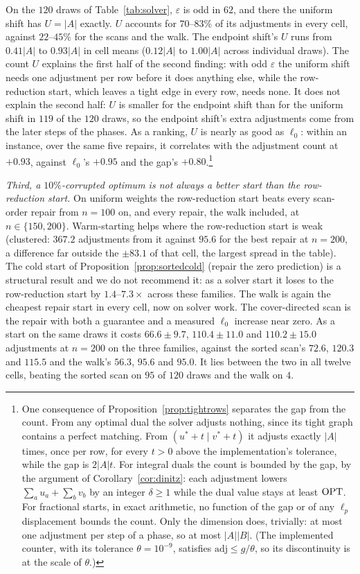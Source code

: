On the $120$ draws of Table~\ref{tab:solver}, $\varepsilon$ is odd in $62$, and there the
uniform shift has $U = |A|$ exactly. $U$ accounts for $70$--$83\%$ of its adjustments in every
cell, against $22$--$45\%$ for the scans and the walk. The endpoint shift's $U$ runs from
$0.41|A|$ to $0.93|A|$ in cell means ($0.12|A|$ to $1.00|A|$ across individual draws). The
count $U$ explains the first half of the second finding: with odd $\varepsilon$ the uniform shift
needs one adjustment per row before it does anything else, while the row-reduction start, which
leaves a tight edge in every row, needs none. It does not explain the second half: $U$ is smaller for
the endpoint shift than for the uniform shift in $119$ of the $120$ draws, so the endpoint shift's
extra adjustments come from the later steps of the phases. As a ranking, $U$ is nearly as good as
$\ell_0$: within an instance, over the same five repairs, it correlates with the adjustment count
at $+0.93$, against $\ell_0$'s $+0.95$ and the gap's $+0.80$.\footnote{One consequence of Proposition~\ref{prop:tightrows} separates the gap from the count. From any optimal dual the solver adjusts nothing, since its tight graph contains a perfect matching. From $(u^* + t \mid v^* + t)$ it adjusts exactly $|A|$ times, once per row, for every $t > 0$ above the implementation's tolerance, while the gap is $2|A|t$. For integral duals the count is bounded by the gap, by the argument of Corollary~\ref{cor:dinitz}: each adjustment lowers $\sum_a u_a + \sum_b v_b$ by an integer $\delta \ge 1$ while the dual value stays at least $\mathrm{OPT}$. For fractional starts, in exact arithmetic, no function of the gap or of any $\ell_p$ displacement bounds the count. Only the dimension does, trivially: at most one adjustment per step of a phase, so at most $|A||B|$. (The implemented counter, with its tolerance $\theta = 10^{-9}$, satisfies $\mathrm{adj} \le g/\theta$, so its discontinuity is at the scale of $\theta$.)}

\emph{Third, a $10\%$-corrupted optimum is not always a better start than the row-reduction
start.} On uniform weights the row-reduction start beats every scan-order repair from
$n = 100$ on, and every repair, the walk included, at $n \in \{150, 200\}$. Warm-starting helps
where the row-reduction start is weak (clustered: $367.2$ adjustments from it against $95.6$ for
the best repair at $n = 200$, a difference far outside the $\pm 83.1$ of that cell, the largest spread in
the table). The cold start of
Proposition~\ref{prop:sortedcold} (repair the zero prediction) is a structural result and we do
not recommend it: as a solver start it loses to the row-reduction start by $1.4$--$7.3\times$ across
these families. The walk is again the cheapest repair start in every cell, now on solver work. The
cover-directed scan is the repair with both a guarantee
and a measured $\ell_0$ increase near zero. As a start on the same draws it costs
$66.6 \pm 9.7$, $110.4 \pm 11.0$ and $110.2 \pm 15.0$ adjustments at $n = 200$ on the three
families, against the sorted scan's $72.6$, $120.3$ and $115.5$ and the walk's $56.3$, $95.6$ and
$95.0$. It lies between the two in all twelve cells, beating the sorted scan on $95$
of $120$ draws and the walk on $4$.

